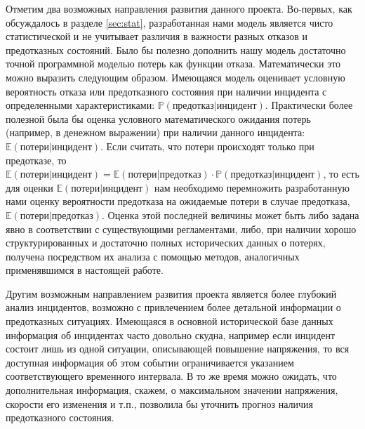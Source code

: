Отметим два возможных направления развития данного проекта. Во-первых, как обсуждалось в разделе \ref{sec:stat}, разработанная нами модель является чисто статистической и не учитывает различия в важности разных отказов и предотказных состояний. Было бы полезно дополнить нашу модель достаточно точной программной моделью потерь как функции отказа. Математически это можно выразить следующим образом. Имеющаяся модель оценивает условную вероятность отказа или предотказного состояния при наличии инцидента с определенными характеристиками: $\mathbb P(\text{предотказ}|\text{инцидент})$. Практически более полезной была бы оценка условного математического ожидания потерь (например, в денежном выражении) при наличии данного инцидента: $\mathbb E(\text{потери}|\text{инцидент})$. Если считать, что потери происходят только при предотказе, то $\mathbb E(\text{потери}|\text{инцидент})=\mathbb E(\text{потери}|\text{предотказ})\cdot\mathbb P(\text{предотказ}|\text{инцидент})$, то есть для оценки $\mathbb E(\text{потери}|\text{инцидент})$ нам необходимо перемножить разработанную нами оценку вероятности предотказа на ожидаемые потери в случае предотказа, $\mathbb E(\text{потери}|\text{предотказ})$. Оценка этой последней величины может быть либо задана явно в соответствии с существующими регламентами, либо, при наличии хорошо структурированных и достаточно полных исторических данных о потерях, получена посредством их анализа с помощью методов, аналогичных применявшимся в настоящей работе.

Другим возможным направлением развития проекта является более глубокий анализ инцидентов, возможно с привлечением более детальной информации о предотказных ситуациях. Имеющаяся в основной исторической базе данных информация об инцидентах часто довольно скудна, например если инцидент состоит лишь из одной ситуации, описывающей повышение напряжения, то вся доступная информация об этом событии ограничивается указанием соответствующего временного интервала. В то же время можно ожидать, что дополнительная информация, скажем, о максимальном значении напряжения, скорости его изменения и т.п., позволила бы уточнить прогноз наличия предотказного состояния.



